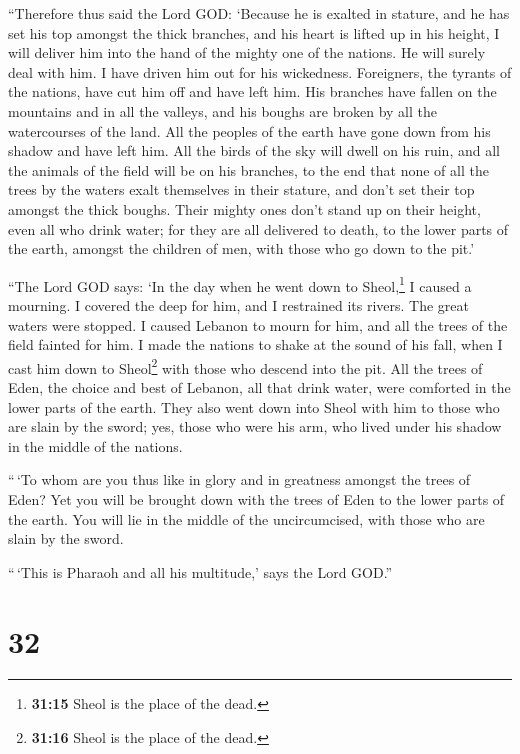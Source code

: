  ``Therefore thus said the Lord GOD: `Because he is
exalted in stature, and he has set his top amongst the thick branches,
and his heart is lifted up in his height,  I will deliver
him into the hand of the mighty one of the nations. He will surely deal
with him. I have driven him out for his wickedness. 
Foreigners, the tyrants of the nations, have cut him off and have left
him. His branches have fallen on the mountains and in all the valleys,
and his boughs are broken by all the watercourses of the land. All the
peoples of the earth have gone down from his shadow and have left him.
 All the birds of the sky will dwell on his ruin, and all
the animals of the field will be on his branches,  to the
end that none of all the trees by the waters exalt themselves in their
stature, and don't set their top amongst the thick boughs. Their mighty
ones don't stand up on their height, even all who drink water; for they
are all delivered to death, to the lower parts of the earth, amongst the
children of men, with those who go down to the pit.'

 ``The Lord GOD says: `In the day when he went down to
Sheol,\footnote{\textbf{31:15} Sheol is the place of the dead.} I caused
a mourning. I covered the deep for him, and I restrained its rivers. The
great waters were stopped. I caused Lebanon to mourn for him, and all
the trees of the field fainted for him.  I made the
nations to shake at the sound of his fall, when I cast him down to
Sheol\footnote{\textbf{31:16} Sheol is the place of the dead.} with
those who descend into the pit. All the trees of Eden, the choice and
best of Lebanon, all that drink water, were comforted in the lower parts
of the earth.  They also went down into Sheol with him to
those who are slain by the sword; yes, those who were his arm, who lived
under his shadow in the middle of the nations.

 ``\,`To whom are you thus like in glory and in greatness
amongst the trees of Eden? Yet you will be brought down with the trees
of Eden to the lower parts of the earth. You will lie in the middle of
the uncircumcised, with those who are slain by the sword.

``\,`This is Pharaoh and all his multitude,' says the Lord GOD.''

\hypertarget{section-31}{%
\section{32}\label{section-31}}

